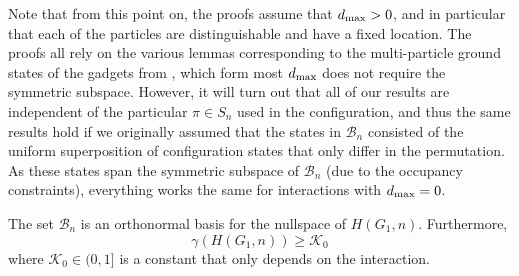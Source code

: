 \documentclass[../thesis-main/thesis-main]{subfiles}
\begin{document}
Note that from this point on, the proofs assume that $d_{\text{max}}>0$, and in particular that each of the particles are distinguishable and have a fixed location.  The proofs all rely on the various lemmas corresponding to the multi-particle ground states of the gadgets from , which form most $d_{\text{max}}$ does not require the symmetric subspace.  However, it will turn out that all of our results are independent of the particular $\pi\in S_n$ used in the configuration, and thus the same results hold if we originally assumed that the states in $\mathcal{B}_n$ consisted of the uniform superposition of configuration states that only differ in the permutation.  As these states span the symmetric subspace of $\mathcal{B}_n$ (due to the occupancy constraints), everything works the same for interactions with $d_{\text{max}} = 0$.

\begin{lemma}
\label{lem:gs_g_alpha}The set $\mathcal{B}_{n}$ is an orthonormal
basis for the nullspace of $H(G_{1},n)$. Furthermore,
\begin{equation}
  \gamma(H(G_{1},n)) \geq \mathcal{K}_0
\label{eq:first_lowerbnd}
\end{equation}
where $\mathcal{K}_0\in (0,1]$ is a constant that only depends on the interaction.
\end{lemma}
\end{document}
